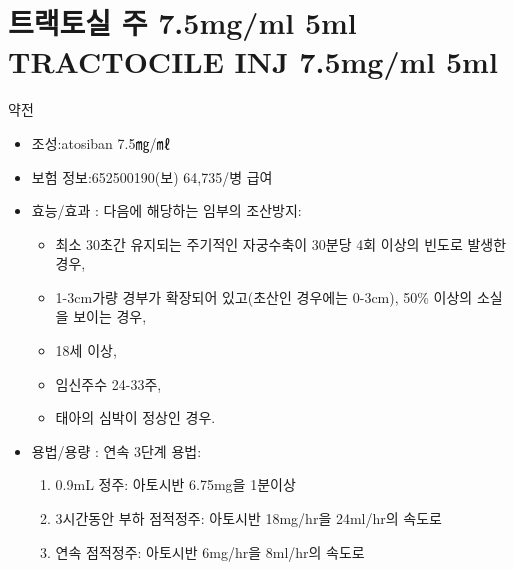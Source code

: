 \section{트랙토실 주 7.5mg/ml 5ml TRACTOCILE INJ 7.5mg/ml 5ml } \label{TractocileInj}
\begin{Adoing}{약전}  

\begin{itemize}\tightlist
\item 조성:atosiban 7.5㎎/㎖
\item 보험 정보:652500190(보) 64,735/병 급여
\item 효능/효과 : 다음에 해당하는 임부의 조산방지: 
	\begin{itemize}[-]\tightlist
	\item 최소 30초간 유지되는 주기적인 자궁수축이 30분당 4회 이상의 빈도로 발생한 경우, 
	\item 1-3cm가량 경부가 확장되어 있고(초산인 경우에는 0-3cm), 50\% 이상의 소실을 보이는 경우, 
	\item 18세 이상, 
	\item 임신주수 24-33주, 
	\item 태아의 심박이 정상인 경우.
	\end{itemize}
\item 용법/용량 : 연속 3단계 용법: 
	\begin{enumerate}\tightlist
	\item 0.9mL 정주: 아토시반 6.75mg을 1분이상 
	\item 3시간동안 부하 점적정주: 아토시반 18mg/hr을 24ml/hr의 속도로 
	\item 연속 점적정주: 아토시반 6mg/hr을 8ml/hr의 속도로 
	\end{enumerate}
\end{itemize}
\end{Adoing}
